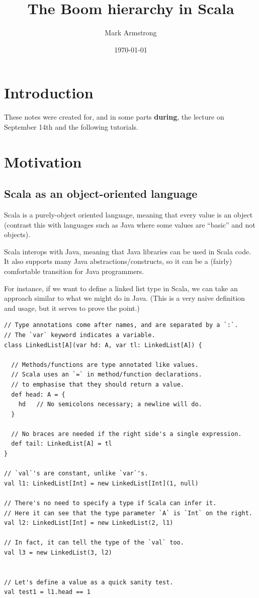 \documentclass[11pt]{article}
\author{Mark Armstrong}
\date{\today}
\title{The Boom hierarchy in Scala}
\begin{document}
\maketitle
\tableofcontents


\section{Introduction}
\label{sec:orga78652b}
These notes were created for, and in some parts \textbf{during},
the lecture on September 14th and the following tutorials.

\section{Motivation}
\label{sec:org14e8c25}

\subsection{Scala as an object-oriented language}
\label{sec:orgc3cfb30}

Scala is a purely-object oriented language,
meaning that every value is an object (contrast this
with languages such as Java where some values
are “basic” and not objects).

Scala interops with Java, meaning that Java libraries can be used
in Scala code. It also supports many Java abstractions/constructs,
so it can be a (fairly) comfortable transition for Java programmers.

For instance, if we want to define a linked list type in Scala,
we can take an approach similar to what we might do in Java.
(This is a very naive definition and usage,
but it serves to prove the point.)
\begin{verbatim}
// Type annotations come after names, and are separated by a `:`.
// The `var` keyword indicates a variable.
class LinkedList[A](var hd: A, var tl: LinkedList[A]) {

  // Methods/functions are type annotated like values.
  // Scala uses an `=` in method/function declarations.
  // to emphasise that they should return a value.
  def head: A = {
    hd   // No semicolons necessary; a newline will do.
  }

  // No braces are needed if the right side's a single expression.
  def tail: LinkedList[A] = tl
}

// `val`'s are constant, unlike `var`'s.
val l1: LinkedList[Int] = new LinkedList[Int](1, null)

// There's no need to specify a type if Scala can infer it.
// Here it can see that the type parameter `A` is `Int` on the right.
val l2: LinkedList[Int] = new LinkedList(2, l1)

// In fact, it can tell the type of the `val` too.
val l3 = new LinkedList(3, l2)


// Let's define a value as a quick sanity test.
val test1 = l1.head == 1
\end{verbatim}
\end{document}

